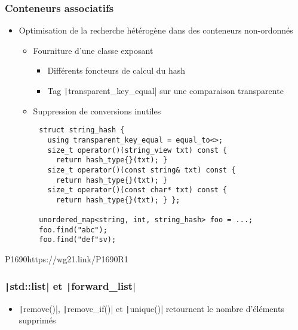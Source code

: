 \documentclass[C++.tex]{subfiles}
\begin{document}
\begin{frame}[fragile]
	\frametitle{Conteneurs associatifs}
	\begin{itemize}
		\item Optimisation de la recherche hétérogène dans des conteneurs non-ordonnés
		\begin{itemize}
			\item Fourniture d'une classe exposant
			\begin{itemize}
				\item Différents foncteurs de calcul du hash
				\item Tag \texttt|transparent_key_equal| sur une comparaison transparente


			\end{itemize}
			\item Suppression de conversions inutiles
		\end{itemize}
	\end{itemize}

	\begin{verbatim}
		struct string_hash {
		  using transparent_key_equal = equal_to<>;
		  size_t operator()(string_view txt) const { 
		    return hash_type{}(txt); }
		  size_t operator()(const string& txt) const {
		    return hash_type{}(txt); }
		  size_t operator()(const char* txt) const {
		    return hash_type{}(txt); } };

		unordered_map<string, int, string_hash> foo = ...;
		foo.find("abc");
		foo.find("def"sv);
	\end{verbatim}

		{P1690}{https://wg21.link/P1690R1}
\end{frame}

\begin{frame}[fragile]
	\frametitle{\texttt|std::list| et \texttt|forward_list|}
	\begin{itemize}
		\item \texttt|remove()|, \texttt|remove_if()| et \texttt|unique()| retournent le nombre d'éléments supprimés
	\end{itemize}

\end{frame}
\end{document}
